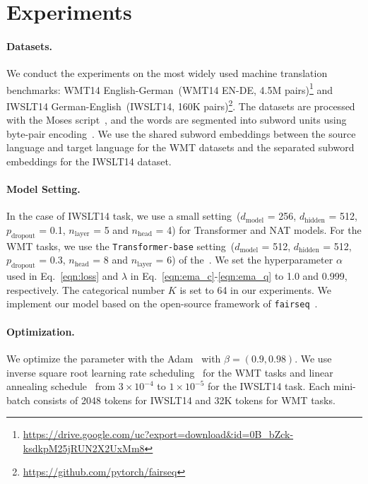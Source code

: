 \section{Experiments}\label{s:exp}
\paragraph{Datasets.} 
We conduct the experiments on the most widely used machine translation benchmarks: WMT14 English-German~(WMT14 EN-DE, 4.5M pairs)\footnote{\url{https://drive.google.com/uc?export=download&id=0B_bZck-ksdkpM25jRUN2X2UxMm8}} and IWSLT14 German-English~(IWSLT14, 160K pairs)\footnote{ \url{https://github.com/pytorch/fairseq}}. 
The datasets are processed with the Moses script~\citep{Moses}, and the words are segmented into subword units using byte-pair encoding~\citep[BPE]{bpe}.  
We use the shared subword embeddings between the source language and target language for the WMT datasets and the separated subword embeddings for the IWSLT14 dataset.
   
\paragraph{Model Setting.} 
In the case of IWSLT14 task, we use a small setting~($d_\text{model}$ = 256, $d_\text{hidden}$ = 512, $p_\text{dropout}$ = 0.1, $n_\text{layer}$ = 5 and $n_\text{head}$ = 4) for Transformer and NAT models. 
For the WMT tasks, we use the \texttt{Transformer-base} setting~($d_\text{model}$ = 512, $d_\text{hidden}$ = 512, $p_\text{dropout}$ = 0.3, $n_\text{head}$ = 8 and $n_\text{layer}$ = 6) of the~\citet{transformer}. 
We set the hyperparameter $\alpha$ used in Eq.~\ref{eqn:loss} and $\lambda$ in Eq.~\ref{eqn:ema_c}-\ref{eqn:ema_q} to 1.0 and 0.999, respectively.
The categorical number $K$ is set to 64 in our experiments.
We implement our model based on the open-source framework of \texttt{fairseq}~\cite{fairseq}.

\paragraph{Optimization.} 
We optimize the parameter with the Adam~\citep{adam} with $\beta=(0.9,0.98)$. 
We use inverse square root learning rate scheduling~\citep{transformer} for the WMT tasks and linear annealing schedule~\cite{iter_nat} from $3\times10^{-4}$ to $1\times10^{-5}$ for the IWSLT14 task.
Each mini-batch consists of 2048 tokens for IWSLT14 and 32K tokens for WMT tasks.

